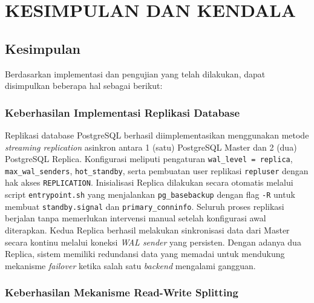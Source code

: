 \chapter{KESIMPULAN DAN KENDALA}

\section{Kesimpulan}

Berdasarkan implementasi dan pengujian yang telah dilakukan, dapat
disimpulkan beberapa hal sebagai berikut:

\subsection{Keberhasilan Implementasi Replikasi Database}

Replikasi database PostgreSQL berhasil diimplementasikan menggunakan
metode \textit{streaming replication} asinkron antara 1 (satu)
PostgreSQL Master dan 2 (dua) PostgreSQL Replica. Konfigurasi meliputi
pengaturan \texttt{wal\_level = replica},
\texttt{max\_wal\_senders}, \texttt{hot\_standby}, serta pembuatan
user replikasi \texttt{repluser} dengan hak akses
\texttt{REPLICATION}. Inisialisasi Replica dilakukan secara otomatis
melalui script \texttt{entrypoint.sh} yang menjalankan
\texttt{pg\_basebackup} dengan flag \texttt{-R} untuk membuat
\texttt{standby.signal} dan \texttt{primary\_conninfo}. Seluruh
proses replikasi berjalan tanpa memerlukan intervensi manual setelah
konfigurasi awal diterapkan. Kedua Replica berhasil melakukan
sinkronisasi data dari Master secara kontinu melalui koneksi
\textit{WAL sender} yang persisten. Dengan adanya dua Replica, sistem
memiliki redundansi data yang memadai untuk mendukung mekanisme
\textit{failover} ketika salah satu \textit{backend} mengalami
gangguan.

\subsection{Keberhasilan Mekanisme Read-Write Splitting}

